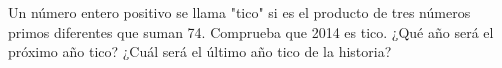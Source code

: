 Un número entero positivo se llama "tico" si es el producto de tres números primos diferentes que suman 74. Comprueba que 2014 es tico. ¿Qué año será el próximo año tico? ¿Cuál será el último año tico de la historia?
